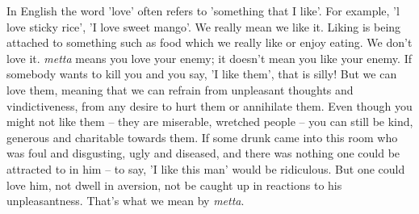 
In English the word 'love' often refers to 'something that I like'. For example, 'l love sticky rice', 'I love sweet mango'. We really mean we like it. Liking is being attached to something such as food which we really like or enjoy eating. We don't love it. \textit{metta} means you love your enemy; it doesn't mean you like your enemy. If somebody wants to kill you and you say, 'I like them', that is silly! But we can love them, meaning that we can refrain from unpleasant thoughts and vindictiveness, from any desire to hurt them or annihilate them. Even though you might not like them -- they are miserable, wretched people -- you can still be kind, generous and charitable towards them. If some drunk came into this room who was foul and disgusting, ugly and diseased, and there was nothing one could be attracted to in him -- to say, 'I like this man' would be ridiculous. But one could love him, not dwell in aversion, not be caught up in reactions to his unpleasantness. That's what we mean by \textit{metta}.

